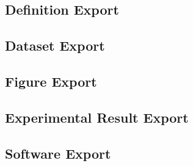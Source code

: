 \documentclass{article}
\begin{document}
\subsection*{Definition Export}

\subsection*{Dataset Export}

\subsection*{Figure Export}

\subsection*{Experimental Result Export}

\subsection*{Software Export}



\end{document}
